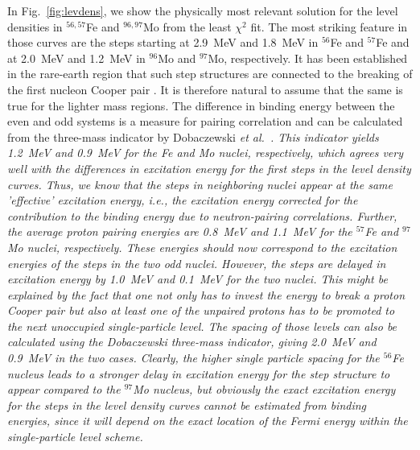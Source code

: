 \begin{multicols}{2}
In Fig.\ \ref{fig:levdens}, we show the physically most relevant solution for 
the level densities in $^{56,57}$Fe and $^{96,97}$Mo from the least $\chi^2$ 
fit. The most striking feature in those curves are the steps starting at 
2.9~MeV and 1.8~MeV in $^{56}$Fe and $^{57}$Fe and at 2.0~MeV and 1.2~MeV in 
$^{96}$Mo and $^{97}$Mo, respectively. It has been established in the 
rare-earth region that such step structures are connected to the breaking of 
the first nucleon Cooper pair \cite{MB99}. It is therefore natural to assume
that the same is true for the lighter mass regions. The difference in binding 
energy between the even and odd systems is a measure for pairing correlation 
and can be calculated from the three-mass indicator by Dobaczewski \sl et al.\ 
\rm \cite{DM01}. This indicator yields 1.2~MeV and 0.9~MeV for the Fe and Mo 
nuclei, respectively, which agrees very well with the differences in excitation
energy for the first steps in the level density curves. Thus, we know that the
steps in neighboring nuclei appear at the same 'effective' excitation energy, 
i.e., the excitation energy corrected for the contribution to the binding 
energy due to neutron-pairing correlations. Further, the average proton pairing
energies are 0.8~MeV and 1.1~MeV for the $^{57}$Fe and $^{97}$Mo nuclei, 
respectively. These energies should now correspond to the excitation energies 
of the steps in the two odd nuclei. However, the steps are delayed in 
excitation energy by 1.0~MeV and 0.1~MeV for the two nuclei. This might be 
explained by the fact that one not only has to invest the energy to break a 
proton Cooper pair but also at least one of the unpaired protons has to be 
promoted to the next unoccupied single-particle level. The spacing of those 
levels can also be calculated using the Dobaczewski three-mass indicator, 
giving 2.0~MeV and 0.9~MeV in the two cases. Clearly, the higher single 
particle spacing for the $^{56}$Fe nucleus leads to a stronger delay in 
excitation energy for the step structure to appear compared to the $^{97}$Mo 
nucleus, but obviously the exact excitation energy for the steps in the level 
density curves cannot be estimated from binding energies, since it will depend 
on the exact location of the Fermi energy within the single-particle level 
scheme.


\end{multicols}

